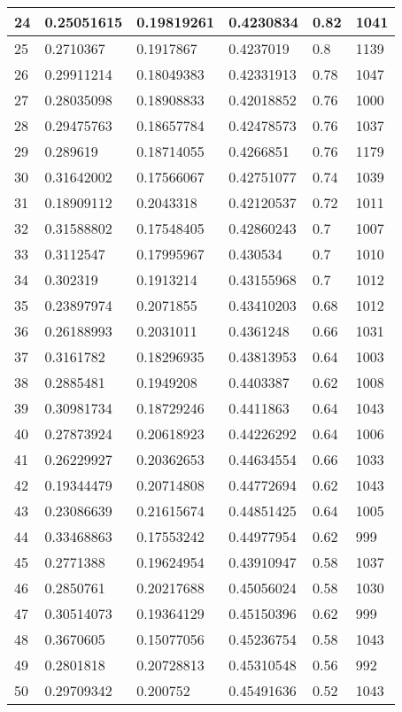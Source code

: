 \begin{longtable}{|l|l|l|l|l|l|}
24 & 0.25051615 & 0.19819261 & 0.4230834 & 0.82 & 1041 \\ \hline 
25 & 0.2710367 & 0.1917867 & 0.4237019 & 0.8 & 1139 \\ \hline 
26 & 0.29911214 & 0.18049383 & 0.42331913 & 0.78 & 1047 \\ \hline 
27 & 0.28035098 & 0.18908833 & 0.42018852 & 0.76 & 1000 \\ \hline 
28 & 0.29475763 & 0.18657784 & 0.42478573 & 0.76 & 1037 \\ \hline 
29 & 0.289619 & 0.18714055 & 0.4266851 & 0.76 & 1179 \\ \hline 
30 & 0.31642002 & 0.17566067 & 0.42751077 & 0.74 & 1039 \\ \hline 
31 & 0.18909112 & 0.2043318 & 0.42120537 & 0.72 & 1011 \\ \hline 
32 & 0.31588802 & 0.17548405 & 0.42860243 & 0.7 & 1007 \\ \hline 
33 & 0.3112547 & 0.17995967 & 0.430534 & 0.7 & 1010 \\ \hline 
34 & 0.302319 & 0.1913214 & 0.43155968 & 0.7 & 1012 \\ \hline 
35 & 0.23897974 & 0.2071855 & 0.43410203 & 0.68 & 1012 \\ \hline 
36 & 0.26188993 & 0.2031011 & 0.4361248 & 0.66 & 1031 \\ \hline 
37 & 0.3161782 & 0.18296935 & 0.43813953 & 0.64 & 1003 \\ \hline 
38 & 0.2885481 & 0.1949208 & 0.4403387 & 0.62 & 1008 \\ \hline 
39 & 0.30981734 & 0.18729246 & 0.4411863 & 0.64 & 1043 \\ \hline 
40 & 0.27873924 & 0.20618923 & 0.44226292 & 0.64 & 1006 \\ \hline 
41 & 0.26229927 & 0.20362653 & 0.44634554 & 0.66 & 1033 \\ \hline 
42 & 0.19344479 & 0.20714808 & 0.44772694 & 0.62 & 1043 \\ \hline 
43 & 0.23086639 & 0.21615674 & 0.44851425 & 0.64 & 1005 \\ \hline 
44 & 0.33468863 & 0.17553242 & 0.44977954 & 0.62 & 999 \\ \hline 
45 & 0.2771388 & 0.19624954 & 0.43910947 & 0.58 & 1037 \\ \hline 
46 & 0.2850761 & 0.20217688 & 0.45056024 & 0.58 & 1030 \\ \hline 
47 & 0.30514073 & 0.19364129 & 0.45150396 & 0.62 & 999 \\ \hline 
48 & 0.3670605 & 0.15077056 & 0.45236754 & 0.58 & 1043 \\ \hline 
49 & 0.2801818 & 0.20728813 & 0.45310548 & 0.56 & 992 \\ \hline 
50 & 0.29709342 & 0.200752 & 0.45491636 & 0.52 & 1043 \\ \hline 
\end{longtable}